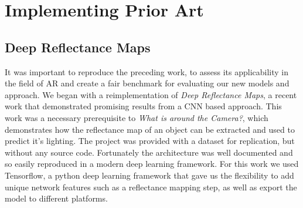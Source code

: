 \documentclass[ %
                    author={Gavin Parker},
                supervisor={Dr. Neill Campbell},
                    degree={MEng},
                     title={Deep Learning for Illumination Estimation from Stereo Images},
                  subtitle={},
                      type={Research},
                      year={2018} ]{dissertation}
\begin{document}

\chapter{Implementing Prior Art}
\label{chap:execution}

\section{Deep Reflectance Maps}
It was important to reproduce the preceding work, to assess its applicability in the field of AR and create a fair benchmark for evaluating our new models and approach. We began with a reimplementation of \textit{Deep Reflectance Maps}, a recent work that demonstrated promising results from a CNN based approach. This work was a necessary prerequisite to \textit{What is around the Camera?}, which demonstrates how the reflectance map of an object can be extracted and used to predict it's lighting. The project was provided with a dataset for replication, but without any source code. Fortunately the architecture was well documented and so easily reproduced in a modern deep learning framework. For this work we used Tensorflow, a python deep learning framework that gave us the flexibility to add unique network features such as a reflectance mapping step, as well as export the model to different platforms.
\end{document}
